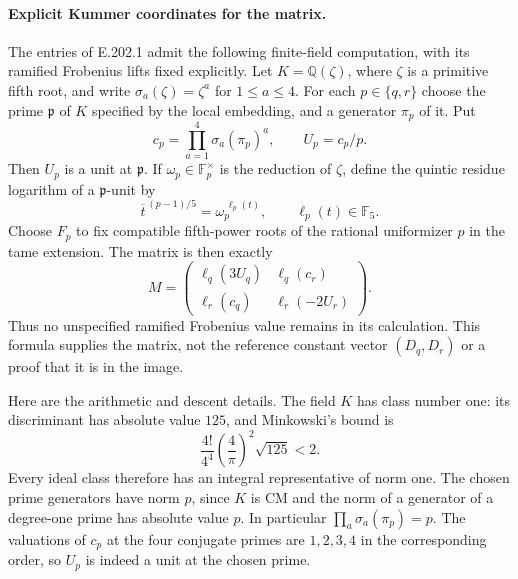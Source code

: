 \paragraph{Explicit Kummer coordinates for the matrix.}
The entries of E.202.1 admit the following finite-field computation,
with its ramified Frobenius lifts fixed explicitly.  Let
$K=\mathbb Q(\zeta)$, where $\zeta$ is a primitive fifth root,
and write $\sigma_a(\zeta)=\zeta^a$ for $1\le a\le4$.
For each $p\in\{q,r\}$ choose the prime $\mathfrak p$ of $K$
specified by the local embedding, and a generator $\pi_p$ of it.
Put
\[
 c_p=\prod_{a=1}^4\sigma_a(\pi_p)^a,
 \qquad U_p=c_p/p.
 \tag{E.202.7}
\]
Then $U_p$ is a unit at $\mathfrak p$.
If $\omega_p\in\mathbb F_p^\times$ is the reduction of $\zeta$,
define the quintic residue logarithm of a $\mathfrak p$-unit by
\[
       \overline t^{\,(p-1)/5}=\omega_p^{\,\ell_p(t)},
       \qquad \ell_p(t)\in\mathbb F_5.
 \tag{E.202.8}
\]
Choose $F_p$ to fix compatible fifth-power roots of the rational
uniformizer $p$ in the tame extension.  The matrix is then exactly
\[
 M=\begin{pmatrix}
       \ell_q(3U_q)&\ell_q(c_r)\\
       \ell_r(c_q)&\ell_r(-2U_r)
    \end{pmatrix}.
 \tag{E.202.9}
\]
Thus no unspecified ramified Frobenius value remains in its
calculation.  This formula supplies the matrix, not the reference
constant vector $(D_q,D_r)$ or a proof that it is in the image.

Here are the arithmetic and descent details.  The field $K$ has
class number one: its discriminant has absolute value $125$, and
Minkowski's bound
\citep[Theorem4.3, p.~70]{MilneANT2020} is
\[
       \frac{4!}{4^4}\left(\frac4\pi\right)^2\sqrt{125}<2.
\]
Every ideal class therefore has an integral representative of norm
one.  The chosen prime generators have norm $p$, since $K$ is
CM and the norm of a generator of a degree-one prime has absolute
value $p$.  In particular $\prod_a\sigma_a(\pi_p)=p$.
The valuations of $c_p$ at the four conjugate primes are
$1,2,3,4$ in the corresponding order, so $U_p$ is indeed a unit
at the chosen prime.

